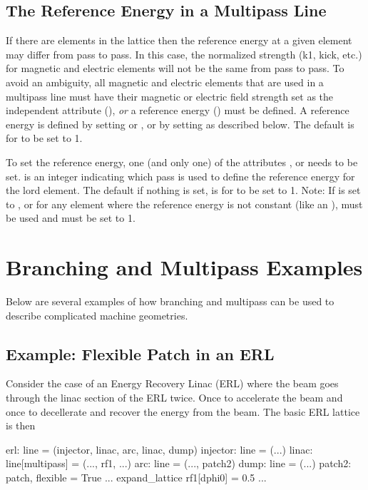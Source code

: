 \subsection{The Reference Energy in a Multipass Line}
\label{s:ref.e.multi}

If there are  elements in the lattice then the reference
energy at a given element may differ from pass to pass. In this case,
the normalized strength (k1, kick, etc.) for magnetic and electric
elements will not be the same from pass to pass. To avoid an
ambiguity, all magnetic and electric elements that are used in a
multipass line must have their magnetic or electric field strength set
as the independent attribute (), {\em or} a reference
energy () must be defined. A reference energy is
defined by setting  or , or by setting
 as described below. The default is for 
to be set to 1.

To set the reference energy, one (and only one) of the attributes
,  or  needs to be
set.  is an integer indicating which pass is used to
define the reference energy for the lord element. The default if
nothing is set, is for  to be set to 1.  Note: If
 is set to , or for any element
where the reference energy is not constant (like an ),
 must be used and must be set to 1.

\section{Branching and Multipass Examples}

Below are several examples of how branching and multipass can be used
to describe complicated machine geometries.

\subsection{Example: Flexible Patch in an ERL}
\label{s:ex.erl}

Consider the case of an Energy Recovery Linac (ERL) where the beam
goes through the linac section of the ERL twice. Once to accelerate
the beam and once to decellerate and recover the energy from the
beam. The basic ERL lattice is then
\begin{example}
  erl: line = (injector, linac, arc, linac, dump)
  injector: line = (...)
  linac: line[multipass] = (..., rf1, ...)
  arc: line = (..., patch2)
  dump: line = (...)
  patch2: patch, flexible = True
  ...
  expand_lattice
  rf1[dphi0] = 0.5
  ...
\end{example}

